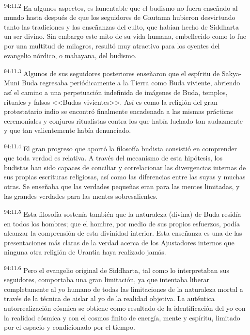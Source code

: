 \par
\textsuperscript{94:11.2} En algunos aspectos, es lamentable que el budismo no fuera enseñado al mundo hasta después de que los seguidores de Gautama hubieron desvirtuado tanto las tradiciones y las enseñanzas del culto, que habían hecho de Siddharta un ser divino. Sin embargo este mito de su vida humana, embellecido como lo fue por una multitud de milagros, resultó muy atractivo para los oyentes del evangelio nórdico, o mahayana, del budismo.

\par
\textsuperscript{94:11.3} Algunos de sus seguidores posteriores enseñaron que el espíritu de Sakya-Muni Buda regresaba periódicamente a la Tierra como Buda viviente, abriendo así el camino a una perpetuación indefinida de imágenes de Buda, templos, rituales y falsos <<Budas vivientes>>. Así es como la religión del gran protestatario indio se encontró finalmente encadenada a las mismas prácticas ceremoniales y conjuros ritualistas contra los que había luchado tan audazmente y que tan valientemente había denunciado.

\par
\textsuperscript{94:11.4} El gran progreso que aportó la filosofía budista consistió en comprender que toda verdad es relativa. A través del mecanismo de esta hipótesis, los budistas han sido capaces de conciliar y correlacionar las divergencias internas de sus propias escrituras religiosas, así como las diferencias entre las suyas y muchas otras. Se enseñaba que las verdades pequeñas eran para las mentes limitadas, y las grandes verdades para las mentes sobresalientes.

\par
\textsuperscript{94:11.5} Esta filosofía sostenía también que la naturaleza (divina) de Buda residía en todos los hombres; que el hombre, por medio de sus propios esfuerzos, podía alcanzar la comprensión de esta divinidad interior. Esta enseñanza es una de las presentaciones más claras de la verdad acerca de los Ajustadores internos que ninguna otra religión de Urantia haya realizado jamás.

\par
\textsuperscript{94:11.6} Pero el evangelio original de Siddharta, tal como lo interpretaban sus seguidores, comportaba una gran limitación, ya que intentaba liberar completamente al yo humano de todas las limitaciones de la naturaleza mortal a través de la técnica de aislar al yo de la realidad objetiva. La auténtica autorrealización cósmica se obtiene como resultado de la identificación del yo con la realidad cósmica y con el cosmos finito de energía, mente y espíritu, limitado por el espacio y condicionado por el tiempo.

